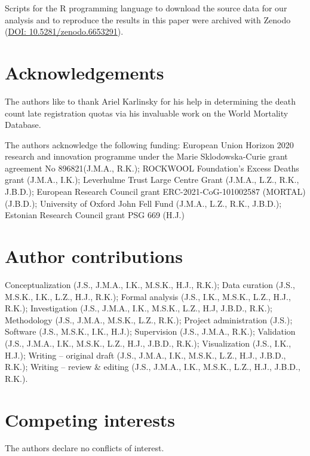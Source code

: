\documentclass[12pt]{article}
\begin{document}
Scripts for the R programming language to download the source data for our analysis and to reproduce the results in this paper were archived with Zenodo (\href{https://zenodo.org/record/6653291}{DOI:  10.5281/zenodo.6653291}).

\clearpage


\clearpage
\appendix

\section*{Acknowledgements}

The authors like to thank Ariel Karlinsky for his help in determining the death count late registration quotas via his invaluable work on the World Mortality Database.

The authors acknowledge the following funding: European Union Horizon 2020 research and innovation programme under the Marie Sklodowska-Curie grant agreement No 896821(J.M.A., R.K.); ROCKWOOL Foundation's Excess Deaths grant (J.M.A., I.K.); Leverhulme Trust Large Centre Grant (J.M.A., L.Z., R.K., J.B.D.); European Research Council grant ERC-2021-CoG-101002587 (MORTAL) (J.B.D.); University of Oxford John Fell Fund (J.M.A., L.Z., R.K., J.B.D.); Estonian Research Council grant PSG 669 (H.J.)

\section*{Author contributions}

Conceptualization (J.S., J.M.A., I.K., M.S.K., H.J., R.K.); Data curation (J.S., M.S.K., I.K., L.Z., H.J., R.K.); Formal analysis (J.S., I.K., M.S.K., L.Z., H.J., R.K.); Investigation (J.S., J.M.A., I.K., M.S.K., L.Z., H.J, J.B.D., R.K.); Methodology (J.S., J.M.A., M.S.K., L.Z., R.K.); Project administration (J.S.); Software (J.S., M.S.K., I.K., H.J.); Supervision (J.S., J.M.A., R.K.); Validation (J.S., J.M.A., I.K., M.S.K., L.Z., H.J., J.B.D., R.K.); Visualization (J.S., I.K., H.J.); Writing -- original draft (J.S., J.M.A., I.K., M.S.K., L.Z., H.J., J.B.D., R.K.); Writing -- review  \& editing (J.S., J.M.A., I.K., M.S.K., L.Z., H.J., J.B.D., R.K.).

\section*{Competing interests}

The authors declare no conflicts of interest.
\end{document}
